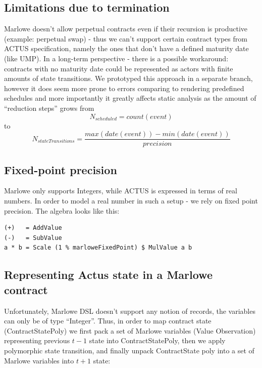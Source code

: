 \documentclass[runningheads]{llncs}
\begin{document}
\subsection{Limitations due to termination}

Marlowe doesn't allow perpetual contracts even if their recursion
is productive (example: perpetual swap) - thus we can't support certain
contract types from ACTUS specification, namely the ones that don't
have a defined maturity date (like UMP). In a long-term perspective
- there is a possible workaround: contracts with no maturity date
could be represented as actors with finite amounts of state transitions.
We prototyped this approach in a separate branch, however it does
seem more prone to errors comparing to rendering predefined schedules
and more importantly it greatly affects static analysis as the amount
of ``reduction steps'' grows from 
\noindent 
\begin{equation}
N_{scheduled}=count(event)
\end{equation}
to 
\noindent 
\begin{equation}
N_{stateTransitions}=\frac{max(date(event))-min(date(event))}{precision} 
\end{equation}

\subsection{Fixed-point precision }

Marlowe only supports Integers, while ACTUS is expressed in terms
of real numbers. In order to model a real number in such a setup -
we rely on fixed point precision. The algebra looks like this: 
\begin{verbatim}
(+)   = AddValue
(-)   = SubValue
a * b = Scale (1 % marloweFixedPoint) $ MulValue a b
\end{verbatim}


\subsection{Representing Actus state in a Marlowe contract}

Unfortunately, Marlowe DSL doesn't support any notion of records,
the variables can only be of type ``Integer''. Thus, in order to
map contract state (ContractStatePoly) we first pack a set of Marlowe
variables (Value Observation) representing previous $t-1$ state into
ContractStatePoly, then we apply polymorphic state transition, and
finally unpack ContractState poly into a set of Marlowe variables
into $t+1$ state:
\end{document}

